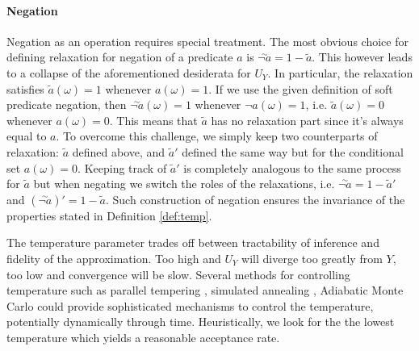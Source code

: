 \paragraph{Negation}
Negation as an operation requires special treatment.
The most obvious choice for defining relaxation for negation of a predicate $a$ is $\overset{\sim}{\neg a} = 1 - \tilde{a}$.
This however leads to a collapse of the aforementioned desiderata for $U_Y$.
In particular, the relaxation satisfies $\tilde{a}(\omega) = 1$ whenever $a(\omega) = 1$. If we use the given definition of soft predicate negation, then $\overset{\sim}{\neg a}(\omega) = 1$ whenever $\neg a(\omega) = 1$, i.e. $\tilde{a}(\omega) = 0$ whenever $a(\omega) = 0$. This means that $\tilde{a}$ has no relaxation part since it's always equal to $a$. To overcome this challenge, we simply keep two counterparts of relaxation: $\tilde{a}$ defined above, and $\tilde{a}'$ defined the same way but for the conditional set $a(\omega) = 0$. Keeping track of $\tilde{a}'$ is completely analogous to the same process for $\tilde{a}$ but when negating we switch the roles of the relaxations, i.e. $\overset{\sim}{\neg a} = 1 - \tilde{a}'$ and $(\overset{\sim}{\neg a})' = 1 - \tilde{a}$. Such construction of negation ensures the invariance of the properties stated in Definition \ref{def:temp}.

The temperature parameter trades off between tractability of inference and fidelity of the approximation.
Too high and $U_Y$ will diverge too greatly from $Y$, too low and convergence will be slow.
Several methods for controlling temperature such as parallel tempering \citep{swendsen1986replica}, simulated annealing \citep{kirkpatrick1983optimization}, Adiabatic Monte Carlo \citep{betancourt2014adiabatic} could provide sophisticated mechanisms to control the temperature, potentially dynamically through time.
Heuristically, we look for the the lowest temperature which yields a reasonable acceptance rate. 


